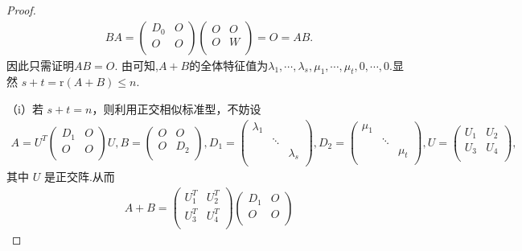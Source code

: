 \documentclass[../../main.tex]{subfiles}%
\begin{document}
\begin{proof}
\begin{align*}
BA = \begin{pmatrix}
D_0&		O\\
O&		O\\
\end{pmatrix}\begin{pmatrix}
O&		O\\
O&		W\\
\end{pmatrix} = O = AB.
\end{align*}
因此只需证明$AB=O$.
由可知,$A+B$的全体特征值为$\lambda _1,\cdots ,\lambda _s,\mu _1,\cdots ,\mu _t,0,\cdots ,0.$显然 $s+t=\mathrm{r}\left( A+B \right) \leqslant n$.

（i）若 $s+t=n$，则利用正交相似标准型，不妨设
\begin{align*}
A=U^T\begin{pmatrix}
D_1&		O\\
O&		O\\
\end{pmatrix} U,B=\begin{pmatrix}
O&		O\\
O&		D_2\\
\end{pmatrix},D_1=\begin{pmatrix}
\lambda _1&		&		\\
&		\ddots&		\\
&		&		\lambda _s\\
\end{pmatrix},D_2=\begin{pmatrix}
\mu _1&		&		\\
&		\ddots&		\\
&		&		\mu _t\\
\end{pmatrix},U=\begin{pmatrix}
U_1&		U_2\\
U_3&		U_4\\
\end{pmatrix},
\end{align*}
其中 $U$ 是正交阵.从而
\begin{align*}
A+B=\begin{pmatrix}
U_{1}^{T}&		U_{2}^{T}\\
U_{3}^{T}&		U_{4}^{T}\\
\end{pmatrix} \begin{pmatrix}
D_1&		O\\
O&		O\\

\end{pmatrix}
\end{align*}
\end{proof}
\end{document}

